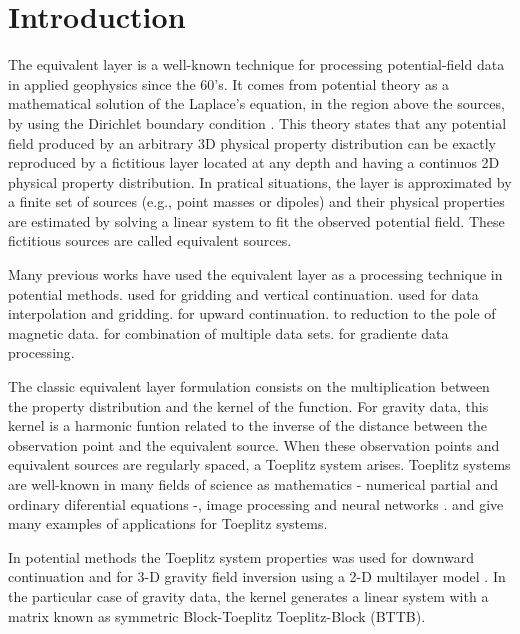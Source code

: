\documentclass[paper]{geophysics}
\begin{document}
\section{Introduction}

The equivalent layer is a well-known technique for processing potential-field data in applied geophysics since the 60's. It comes from potential theory as a mathematical solution of the Laplace's equation, in the region above the sources, by using the Dirichlet boundary condition \cite[]{kellogg1929}.
This theory states that any potential field produced by an arbitrary 3D physical property distribution can be exactly reproduced by a fictitious layer located at any depth and having a continuos 2D physical property  distribution. In pratical situations, the layer is approximated by a finite set of sources (e.g., point masses or dipoles) and their physical properties are estimated by solving a linear system to fit the observed potential field. These fictitious sources are called equivalent sources.

Many previous works have used the equivalent layer as a processing technique in potential methods. \cite{dampney1969equivalent} used  for gridding and vertical continuation. \cite{cordell1992, mendonca-silva1994} used for data interpolation and gridding. \cite{emilia1973,hansen-miyazaki1984,li-oldenburg2010} for upward continuation. \cite{silva1986,leao-silva1989,guspi-novara2009,oliveirajr-etal2013} to reduction to the pole of magnetic data. \cite{boggs-dransfield2004} for combination of multiple data sets. \cite{barnes-lumley2011} for gradiente data processing.

The classic equivalent layer formulation consists on the multiplication between the property distribution and the kernel of the function. For gravity data, this kernel is a harmonic funtion related to the inverse of the distance between the observation point and the equivalent source. When these observation points and equivalent sources are regularly spaced, a Toeplitz system arises. Toeplitz systems are well-known in many fields of science as mathematics - numerical partial and ordinary diferential equations \cite[]{lin2003strang} -, image processing \cite[]{chan1999cosine} and neural networks \cite[]{wray1994calculation}. \cite{chan2007introduction} and \cite{jin2003developments} give many examples of applications for Toeplitz systems.

In potential methods the Toeplitz system properties was used for downward continuation \cite[]{zhang2016bttb} and for 3-D gravity field inversion using a 2-D multilayer model \cite[]{zhang2015bttb}. In the particular case of gravity data, the kernel generates a linear system with a matrix known as symmetric Block-Toeplitz Toeplitz-Block (BTTB). 
\end{document}
